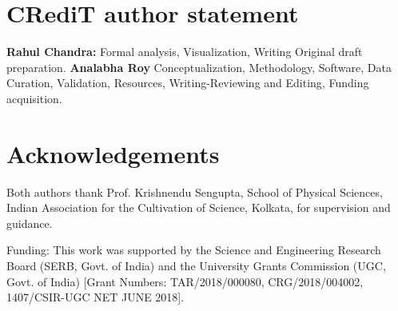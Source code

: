 \documentclass[preprint,5p,times,twocolumn]{elsarticle}
\begin{document}
\section*{CRediT author statement}
\textbf{Rahul Chandra:} Formal analysis, Visualization, Writing Original draft preparation. \textbf{Analabha Roy}  Conceptualization, Methodology, Software, Data Curation, Validation, Resources, Writing-Reviewing and Editing, Funding acquisition.

\section*{Acknowledgements}
 Both authors thank Prof. Krishnendu Sengupta, School of Physical Sciences, Indian Association for the Cultivation of Science, Kolkata, for supervision and guidance.
 
Funding: This work was supported by the Science and Engineering Research Board (SERB, Govt. of India) and the University Grants Commission (UGC, Govt. of India) [Grant Numbers: TAR/2018/000080, CRG/2018/004002, 1407/CSIR-UGC NET JUNE 2018].



	
\end{document}

